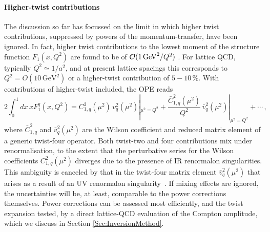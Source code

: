 \paragraph*{Higher-twist contributions} The discussion so far has focussed on the limit in which higher twist contributions, suppressed by powers of the momentum-transfer, have been ignored. In fact, higher twist contributions to the lowest moment of the structure function $F_1(x,Q^2)$ are found to be of ${\cal O}(1\, \mbox{GeV}^2/Q^2)$ \cite{Blumlein:2008kz}. For lattice QCD, typically $Q^2 \simeq 1/a^2$, and at present lattice spacings this corresponds to $Q^2 = O(10\,\mbox{GeV}^2)$ or a higher-twist contribution of $5 - 10\, \%$. With contributions of higher-twist included, the OPE reads
\begin{equation}
2 \int_0^1 dx\, x F_1^q(x,Q^2) = C_{1,q}^2(\mu^2)\, v_q^2(\mu^2)|_{\mu^2=Q^2} + \frac{\bar{C}_{1,q}^2(\mu^2)}{Q^2}\, \bar{v}_q^2(\mu^2)|_{\mu^2=Q^2} + \cdots \,,
\label{tex}
\end{equation}
where $\bar{C}_{1,q}^2$ and $\bar{v}_q^2(\mu^2)$ are the Wilson coefficient and reduced matrix element of a generic twist-four operator. Both twist-two and four contributions mix under renormalisation, to the extent that the perturbative series for the Wilson coefficients $C_{1,q}^2(\mu^2)$ diverges due to the presence of IR renormalon singularities. This ambiguity is canceled by that in the twist-four matrix element $\bar{v}_q^2(\mu^2)$ that arises as a result of an UV renormalon singularity~\cite{Martinelli:1996pk}. If mixing effects are ignored, the uncertainties will be, at least, comparable to the power corrections themselves. Power corrections can be assessed most efficiently, and the twist expansion tested, by a direct lattice-QCD evaluation of the Compton amplitude, which we discuss in Section \ref{Sec:InversionMethod}.

